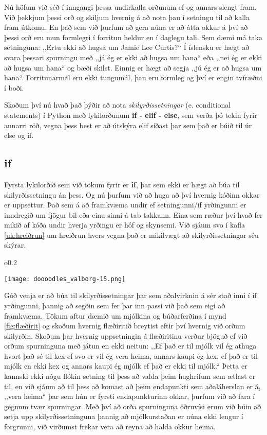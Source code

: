 Nú höfum við séð í inngangi þessa undirkafla orðunum ef og annars slengt fram.
Við þekkjum þessi orð og skiljum hvernig á að nota þau í setningu til að kalla fram útkomu.
En það sem við þurfum að gera núna er að átta okkur á því að þessi orð eru mun formlegri í forritun heldur en í daglegu tali.
Sem dæmi má taka setninguna: ,,Ertu ekki að hugsa um Jamie Lee Curtis?“
Í íslensku er hægt að svara þessari spurningu með ,,já ég er ekki að hugsa um hana“ eða ,,nei ég er ekki að hugsa um hana“ og bæði skilst.
Einnig er hægt að segja ,,jú ég er að hugsa um hana“.
Forritunarmál eru ekki tungumál, þau eru formleg og því er engin tvíræðni í boði.

Skoðum því nú hvað það þýðir að nota \textit{skilyrðissetningar} (e. conditional statements) í Python með lykilorðunum \textbf{if - elif - else}, sem verða þó tekin fyrir annarri röð, vegna þess best er að útskýra elif síðast þar sem það er búið til úr else og if.

\subsection{if}
Fyrsta lykilorðið sem við tökum fyrir er \textbf{if}, þar sem ekki er hægt að búa til skilyrðissetningu án þess.
Og nú þurfum við að huga að því hvernig kóðinn okkar er uppsettur.
Það sem á að framkvæma undir ef setningunni/if yrðingunni er inndregið um fjögur bil eða einu sinni á tab takkann.
Eina sem ræður því hvað fer mikið af kóða undir hverja yrðingu er hóf og skynsemi.
Við sjáum svo í kafla \ref{uk:hreiðrun} um hreiðrun hvers vegna það er mikilvægt að skilyrðissetningar séu skýrar.
\begin{wrapfigure}{o}{0.2\textwidth} %
	\begin{center}
		\texttt{[image: doooodles\_valborg-15.png]}
	\end{center}
\end{wrapfigure}
Góð venja er að búa til skilyrðissetningar þar sem aðalvirknin á sér stað inni í if yrðingunni, þannig að segðin sem fer þar inn passi við það sem eigi að framkvæma.
Tökum aftur dæmið um mjólkina og búðarferðina í mynd \ref{fig:flæðirit} og skoðum hvernig flæðiritið breytist eftir því hvernig við orðum skilyrðin.
Skoðum þar hvernig uppsetningin á flæðiritinu verður bjöguð ef við orðum spurninguna með játun en ekki neitun: ,,Ef það er til mjólk vil ég athuga hvort það sé til kex ef svo er vil ég vera heima, annars kaupi ég kex, ef það er til mjólk en ekki kex og annars kaupi ég mjólk ef það er ekki til mjólk.“
Þetta er kannski ekki nógu flókin setning til þess að valda þeim hughrifum sem ætlast er til, en við sjáum að til þess að komast að þeim endapunkti sem aðaláherslan er á, ,,vera heima“ þar sem hún er fyrsti endapunkturinn okkar, þurfum við að fara í gegnum tvær spurningar.
Með því að orða spurninguna öðruvísi erum við búin að setja upp skilyrðissetninguna þannig að mjólkurstaðan er núna ekki lengur í forgrunni, við virðumst frekar vera að reyna að halda okkur heima.

